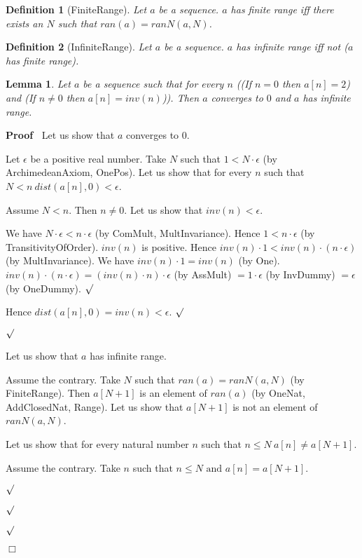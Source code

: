 \documentclass{article}
\newenvironment{forthel}{\begin{leftbar}}{\end{leftbar}}
\newenvironment{proof}{\noindent\textbf{Proof\ }}{\hspace*{\fill}$\Box$\medskip}
\newenvironment{subproof}{\begin{list}{}{}
		\item[\text{Proof}]}{\hfill $\surd$ \end{list}}
\newtheorem{lemma}{Lemma}
\newtheorem{definition}{Definition}
\newcommand{\dotequal}{=}
\begin{document}
\begin{forthel}
	\begin{definition}[FiniteRange]	Let $a$ be a sequence. $a$ has finite range iff there exists an $N$ such that $ran(a) = ranN(a,N)$.
	\end{definition}

	\begin{definition}[InfiniteRange] Let $a$ be a sequence. $a$ has infinite range iff not ($a$ has finite range).
	\end{definition}
	
	\begin{lemma} Let $a$ be a sequence such that for every $n$
	((If $n = 0$ then $a[n] = 2$) and (If $n \neq 0$ then $a[n] = inv(n)$)).
	Then $a$ converges to $0$ and $a$ has infinite range.
	\end{lemma}
	\begin{proof} Let us show that $a$ converges to $0$.
	\begin{subproof}
	Let $\epsilon$ be a positive real number. 
	Take $N$ such that $1 < N \cdot \epsilon$ (by ArchimedeanAxiom, OnePos).
	Let us show that for every $n$ such that $N < n \ dist(a[n],0) < \epsilon$.
	\begin{subproof}
	Assume $N < n$. Then $n \neq 0$.
	Let us show that $inv(n) < \epsilon$.
	\begin{subproof}
	We have $N \cdot \epsilon < n \cdot \epsilon$ (by ComMult, MultInvariance).
	Hence $1 < n \cdot \epsilon$ (by TransitivityOfOrder).
	$inv(n)$ is positive.
	Hence $inv(n) \cdot 1 < inv(n) \cdot (n \cdot \epsilon)$ (by MultInvariance).
	We have $inv(n) \cdot 1 = inv(n)$ (by One).
	$inv(n) \cdot (n \cdot \epsilon) \dotequal (inv(n) \cdot n) \cdot \epsilon$ (by AssMult)
	$\dotequal 1 \cdot \epsilon$ (by InvDummy)
	$\dotequal \epsilon$ (by OneDummy).
	\end{subproof}
	Hence $dist(a[n],0) = inv(n) < \epsilon$.
	\end{subproof}
	\end{subproof}
	Let us show that $a$ has infinite range.
	\begin{subproof}
	Assume the contrary.
	Take $N$ such that $ran(a) = ranN(a,N)$ (by FiniteRange).
	Then $a[N + 1]$ is an element of $ran(a)$ (by OneNat, AddClosedNat, Range).
	Let us show that $a[N + 1]$ is not an element of $ranN(a,N)$.
	\begin{subproof}
	Let us show that for every natural number $n$ such that $n \leq N \ a[n] \neq a[N + 1]$.
	\begin{subproof}
	Assume the contrary.
	Take $n$ such that $n \leq N \text{ and } a[n] = a[N + 1]$.

\end{subproof}
\end{subproof}
\end{subproof}
\end{proof}
\end{forthel}
\end{document}

